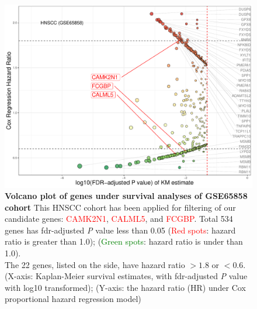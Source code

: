 \documentclass[jpm,article,submit,moreauthors,pdftex]{Definitions/mdpi}
\newcommand{\bcaption}[2]{\caption{\textbf{#1} #2}}
\begin{document}
\begin{figure}
    \centering
    \includegraphics[width=13cm]{Rplot_GSE65858_CoxHR_CAMK2N1_top3FDRKM.pdf}
    \bcaption{Volcano plot of genes under survival analyses of GSE65858 cohort}{
    This HNSCC cohort has been applied for filtering of our candidate genes: \textcolor{red}{CAMK2N1}, \textcolor{red}{CALML5}, and \textcolor{red}{FCGBP}.
    Total 534 genes has \acrshort{fdr}-adjusted \textit{P} value less than 0.05
    (\textcolor{red}{Red spots}: hazard ratio is greater than 1.0);
    (\textcolor{green}{Green spots}: hazard ratio is under than 1.0).\\
    The 22 genes, listed on the side, have hazard ratio $> 1.8$ or $<0.6$.\\
    (X-axis: Kaplan-Meier survival estimates, with \acrshort{fdr}-adjusted \textit{P} value with log10 transformed);
    (Y-axis: the hazard ratio (HR) under Cox proportional hazard regression model)
    }
    \label{fig:hazards534}
\end{figure}







\end{document}

